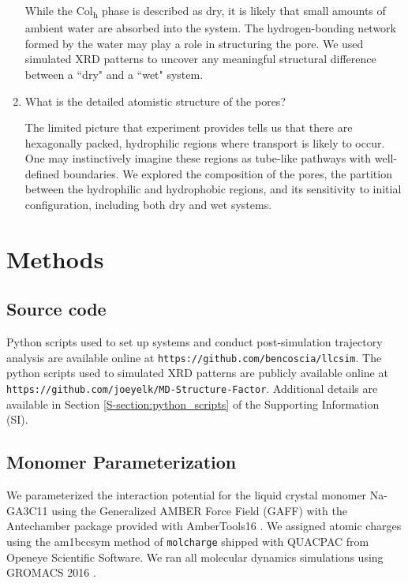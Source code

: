 \documentclass[journal=jpcbfk,manuscript=article]{achemso}
\begin{document}
\begin{enumerate}
	While the Col\textsubscript{h} phase is described as dry, it is likely
	that small amounts of ambient water are absorbed into the system. The
	hydrogen-bonding network formed by the water may play a role in structuring the
	pore. We used simulated XRD patterns to uncover any meaningful structural
	difference between a ``dry" and a ``wet" system.

	\item What is the detailed atomistic structure of the pores?\label{point:composition}

	The limited picture that experiment provides tells us that there are hexagonally packed, 
	hydrophilic regions where transport is likely to occur. One may instinctively imagine these 
	regions as tube-like pathways with well-defined boundaries. We explored the composition
	of the pores, the partition between the hydrophilic and hydrophobic regions, and its 
	sensitivity to initial configuration, including both dry and wet systems. 

  \end{enumerate}

  \section{Methods}
 
  \subsection{Source code}

  Python scripts used to set up systems and conduct post-simulation trajectory analysis are
  available online at \texttt{https://github.com/bencoscia/llcsim}. The python scripts used
  to simulated XRD patterns are publicly available online at \\
  \texttt{https://github.com/joeyelk/MD-Structure-Factor}. Additional details are available in 
  Section \ref{S-section:python_scripts} of the Supporting Information (SI).
  
  \subsection{Monomer Parameterization}\label{method:parameterization}

  We parameterized the interaction potential for the liquid crystal monomer 
  Na-GA3C11 using the Generalized AMBER Force Field (GAFF) 
  \cite{wang_development_2004} with the Antechamber package \cite{wang_automatic_2006} 
  provided with AmberTools16 \cite{case_ambertools16_2016}. We assigned atomic
  charges using the am1bccsym method of \texttt{molcharge} shipped with QUACPAC
  from Openeye Scientific Software. We ran all molecular dynamics simulations 
  using GROMACS 2016 \cite{bekker_gromacs:_1993,berendsen_gromacs:_1995,van_der_spoel_gromacs:_2005,hess_gromacs_2008}.
\end{document}
